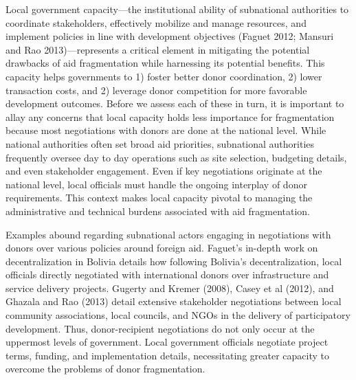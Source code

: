 \documentclass[11pt]{article}
\begin{document}
Local government capacity—the institutional ability of subnational authorities to coordinate stakeholders, effectively mobilize and manage resources, and implement policies in line with development objectives (Faguet 2012; \citep{mansuri} Mansuri and Rao 2013)—represents a critical element in mitigating the potential drawbacks of aid fragmentation while harnessing its potential benefits. This capacity helps governments to 1) foster better donor coordination, 2) lower transaction costs, and 2) leverage donor competition for more favorable development outcomes. Before we assess each of these in turn, it is important to allay any concerns that local capacity holds less importance for fragmentation because most negotiations with donors are done at the national level. While national authorities often set broad aid priorities, subnational authorities frequently oversee day to day operations such as site selection, budgeting details, and even stakeholder engagement. Even if key negotiations originate at the national level, local officials must handle the ongoing interplay of donor requirements. This context makes local capacity pivotal to managing the administrative and technical burdens associated with aid fragmentation.

Examples abound regarding subnational actors engaging in negotiations with donors over various policies around foreign aid. Faguet’s in-depth work on decentralization in Bolivia details how following Bolivia’s decentralization, local officials directly negotiated with international donors over infrastructure and service delivery projects. Gugerty and Kremer (2008), Casey et al (2012), and Ghazala and Rao (2013) detail extensive stakeholder negotiations between local community associations, local councils, and NGOs in the delivery of participatory development. Thus, donor-recipient negotiations do not only occur at the uppermost levels of government. Local government officials negotiate project terms, funding, and implementation details, necessitating greater capacity to overcome the problems of donor fragmentation.
\end{document}
